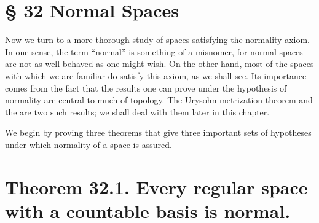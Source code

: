 \section*{§ 32 Normal Spaces}

Now we turn to a more thorough study of spaces satisfying the normality axiom. In one sense, the term ``normal'' is something of a misnomer, for normal spaces are not as well-behaved as one might wish. On the other hand, most of the spaces with which we are familiar do satisfy this axiom, as we shall see. Its importance comes from the fact that the results one can prove under the hypothesis of normality are central to much of topology. The Urysohn metrization theorem and the  are two such results; we shall deal with them later in this chapter.

We begin by proving three theorems that give three important sets of hypotheses under which normality of a space is assured.

\section*{Theorem 32.1. Every regular space with a countable basis is normal.}

